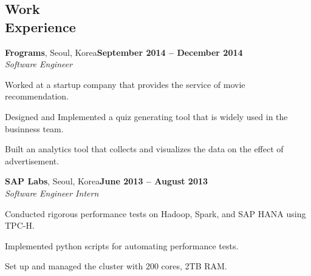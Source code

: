 \documentclass[11pt,margin,line]{cv}
\begin{document}
\begin{resume}
    \section{\mysidestyle Work\\Experience}
    \textbf{Frograms}, Seoul, Korea\hfill \textbf{September 2014 -- December 2014} \vspace{1mm}\\\vspace{0mm}%
    \textsl{Software Engineer}
    \vspace{-2mm}\\\vspace{-1mm}%
    \begin{list3}
        \item Worked at a startup company that provides the service of movie recommendation.
        \item Designed and Implemented a quiz generating tool that is widely used in the businness team.
        \item Built an analytics tool that collects and visualizes the data on the effect of advertisement.
    \end{list3}

    \textbf{SAP Labs}, Seoul, Korea\hfill \textbf{June 2013 -- August 2013} \vspace{1mm}\\\vspace{0mm}%
    \textsl{Software Engineer Intern}
    \vspace{-2mm}\\\vspace{-1mm}%
    \begin{list3}
        \item Conducted rigorous performance tests on Hadoop, Spark, and SAP HANA using TPC-H.
        \item Implemented python scripts for automating performance tests.
        \item Set up and managed the cluster with 200 cores, 2TB RAM.
    \end{list3}



\end{resume}
\end{document}
